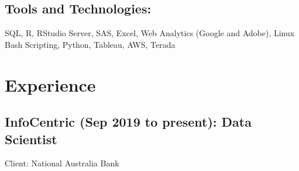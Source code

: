 \documentclass{article}
\begin{document}
\subsection{Tools and Technologies:}
SQL, R, RStudio Server, SAS, Excel, Web Analytics (Google and Adobe), Linux Bash Scripting, Python, Tableau, AWS, Terada

\section{Experience}


\subsection{InfoCentric (Sep 2019 to present): Data Scientist}
Client: National Australia Bank
\end{document}
